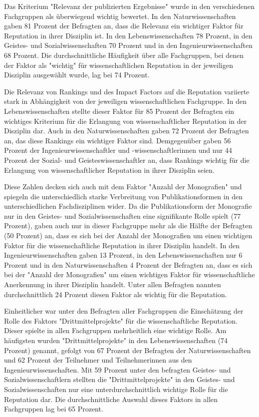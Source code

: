 Das Kriterium "Relevanz der publizierten Ergebnisse" wurde in den verschiedenen Fachgruppen als überwiegend wichtig bewertet. In den Naturwissenschaften gaben 81 Prozent der Befragten an, dass die Relevanz ein wichtiger Faktor für Reputation in ihrer Disziplin ist. In den Lebenswissenschaften 78 Prozent, in den Geistes- und Sozialwissenschaften 70 Prozent und in den Ingenieurwissenschaften 68 Prozent. Die durchschnittliche Häufigkeit über alle Fachgruppen, bei denen der Faktor als "wichtig" für wissenschaftlichen Reputation in der jeweiligen Disziplin ausgewählt wurde, lag bei 74 Prozent.

Die Relevanz von Rankings und des Impact Factors auf die Reputation variierte stark in Abhängigkeit von der jeweiligen wissenschaftlichen Fachgruppe. In den Lebenswissenschaften stellte dieser Faktor für 85 Prozent der Befragten ein wichtiges Kriterium für die Erlangung von wissenschaftlicher Reputation in der Disziplin dar. Auch in den Naturwissenschaften gaben 72 Prozent der Befragten an, das diese Rankings ein wichtiger Faktor sind. Demgegenüber gaben 56 Prozent der Ingenieurwissenschaftler und -wissenschaftlerinnen und nur 44 Prozent der Sozial- und Geisteswissenschaftler an, dass Rankings wichtig für die Erlangung von wissenschaftlicher Reputation in ihrer Disziplin seien.

Diese Zahlen decken sich auch mit dem Faktor "Anzahl der Monografien" und spiegeln die unterschiedlich starke Verbreitung von Publikationsformen in den unterschiedlichen Fachdisziplinen wider. Da die Publikationsform der Monografie nur in den Geistes- und Sozialwissenschaften eine signifikante Rolle spielt (77 Prozent), gaben auch nur in dieser Fachgruppe mehr als die Hälfte der Befragten (50 Prozent) an, dass es sich bei der Anzahl der Monografien um einen wichtigen Faktor für die wissenschaftliche Reputation in ihrer Disziplin handelt. In den Ingenieurwissenschaften gaben 13 Prozent, in den Lebenswissenschaften nur 6 Prozent und in den Naturwissenschaften 4 Prozent der Befragten an, dass es sich bei der "Anzahl der Monografien" um einen wichtigen Faktor für wissenschaftliche Anerkennung in ihrer Disziplin handelt. Unter allen Befragten nannten durchschnittlich 24 Prozent diesen Faktor als wichtig für die Reputation.

Einheitlicher war unter den Befragten aller Fachgruppen die Einschätzung der Rolle des Faktors "Drittmittelprojekte" für die wissenschaftliche Reputation. Dieser spielte in allen Fachgruppen mehrheitlich eine wichtige Rolle. Am häufigsten wurden "Drittmittelprojekte" in den Lebenswissenschaften (74 Prozent) genannt, gefolgt von 67 Prozent der Befragten der Naturwissenschaften und 62 Prozent der Teilnehmer und Teilnehmerinnen aus den Ingenieurwissenschaften. Mit 59 Prozent unter den befragten Geistes- und Sozialwissenschaftlern stellten die "Drittmittelprojekte" in den Geistes- und Sozialwissenschaften nur eine unterdurchschnittlich wichtige Rolle für die Reputation dar. Die durchschnittliche Auswahl dieses Faktors in allen Fachgruppen lag bei 65 Prozent.

